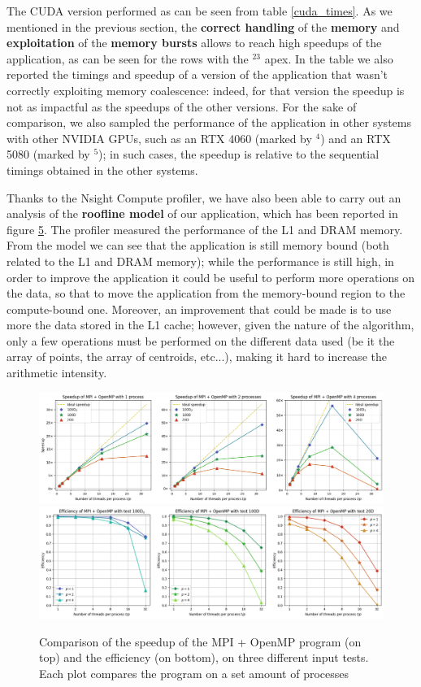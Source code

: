 \documentclass[11pt, journal]{IEEEtran}
\newcommand{\nwl}{

\vspace{11pt}

}
\begin{document}
The CUDA version performed as can be seen from table \ref{cuda_times}. As we mentioned in the previous section, the \textbf{correct handling} of the \textbf{memory} and \textbf{exploitation} of the \textbf{memory bursts} allows to reach high speedups of the application, as can be seen for the rows with the \textasteriskcentered$^{23}$ apex. In the table we also reported the timings and speedup of a version of the application that wasn't correctly exploiting memory coalescence: indeed, for that version the speedup is not as impactful as the speedups of the other versions. For the sake of comparison, we also sampled the performance of the application in other systems with other NVIDIA GPUs, such as an RTX 4060 (marked by \textasteriskcentered$^4$) and an RTX 5080 (marked by \textasteriskcentered$^5$); in such cases, the speedup is relative to the sequential timings obtained in the other systems.
\nwl
Thanks to the Nsight Compute profiler, we have also been able to carry out an analysis of the \textbf{roofline model} of our application, which has been reported in figure \href{cuda_roofline}{5}. The profiler measured the performance of the L1 and DRAM memory. From the model we can see that the application is still memory bound (both related to the L1 and DRAM memory); while the performance is still high, in order to improve the application it could be useful to perform more operations on the data, so that to move the application from the memory-bound region to the compute-bound one. Moreover, an improvement that could be made is to use more the data stored in the L1 cache; however, given the nature of the algorithm, only a few operations must be performed on the different data used (be it the array of points, the array of centroids, etc...), making it hard to increase the arithmetic intensity.

\begin{figure}
    \label{stats_mpi_omp}
    \centering
    \includegraphics[width=\linewidth]{imgs/mpi_omp_speedup.png}
    \includegraphics[width=\linewidth]{imgs/mpi_omp_efficiency.png}

    \caption{Comparison of the speedup of the MPI + OpenMP program (on top) and the efficiency (on bottom), on three different input tests. Each plot compares the program on a set amount of processes}
\end{figure}
\end{document}
